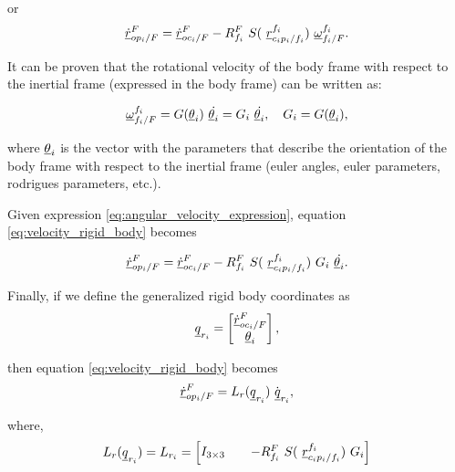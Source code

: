 or
\begin{equation}
    \pvec{\dot{r}}{op_{i}}{F}{F} = \pvec{\dot{r}}{oc_{i}}{F}{F} - 
    \rot{R}{f_{i}}{F} \ S( \ \pvec{r}{c_{i}p_{i}}{f_i}{f_i})\ \pvec{\omega}{f_{i}}{F}{f_i}.
    \label{eq:velocity_rigid_body}
\end{equation}

It can be proven that the rotational velocity of the body frame with respect to
the inertial frame (expressed in the body frame) can be written as:

\begin{equation}
    \pvec{\omega}{f_{i}}{F}{f_i} = G(\vecd{\theta}_{i}) \ \dot{\vecd{\theta}_{i}} = 
    G_{i} \ \dot{\vecd{\theta}_{i}}, \quad G_{i} = G(\vecd{\theta}_{i}),  
    \label{eq:angular_velocity_expression}
\end{equation}

where $\underline{\theta}_{i}$ is the vector with the parameters that describe the orientation 
of the body frame with respect to the inertial frame (euler angles, euler parameters,
rodrigues parameters, etc.).

Given expression \eqref{eq:angular_velocity_expression}, equation \eqref{eq:velocity_rigid_body}
becomes    

\[
    \pvec{\dot{r}}{op_{i}}{F}{F} = \pvec{\dot{r}}{oc_{i}}{F}{F} - 
    \rot{R}{f_{i}}{F} \ S( \ \pvec{r}{c_{i}p_{i}}{f_i}{f_i})\ 
    G_{i}\ \dot{\vecd{\theta}_{i}}.
\]

Finally, if we define the generalized rigid body coordinates as 
\begin{equation}
    \vecd{q}_{r_{i}} = \begin{bmatrix}
        \pvec{\dot{r}}{oc_{i}}{F}{F} \\  \vecd{\theta}_{i}
    \end{bmatrix},
    \label{eq:rigid_body_coordinates}
\end{equation}

then equation \eqref{eq:velocity_rigid_body} becomes
\begin{equation}
    \pvec{\dot{r}}{op_{i}}{F}{F} = L_{r}(\vecd{q}_{r_{i}}) \ \dot{\vecd{q}}_{r_{i}},
    \label{velocity_rigid_body_matrix}
\end{equation}

where,
\begin{equation}
    L_{r}(\vecd{q}_{r_{i}}) = L_{r_i} = \begin{bmatrix}
    I_{3 \times 3} && -\rot{R}{f_{i}}{F} \ S( \ \pvec{r}{c_{i}p_{i}}{f_i}{f_i})\ G_{i}         
    \label{eq:lamda_mat_rigid_body}
    \end{bmatrix}
\end{equation}

